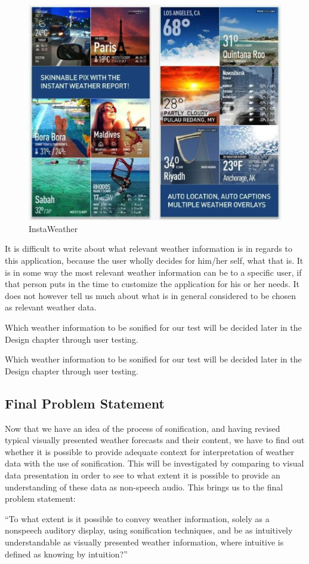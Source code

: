 \begin{figure}[!htbp]
    \centering
    \includegraphics[width=.7\textwidth]{images/Instaweather1.png}
    \caption{InstaWeather}
    \label{fig:instaweather1}
\end{figure}

It is difficult to write about what relevant weather information is in regards to this application, because the user wholly decides for him/her self, what that is. It is in some way the most relevant weather information can be to a specific user, if that person puts in the time to customize the application for his or her needs. It does not however tell us much about what is in general considered to be chosen as relevant weather data.

Which weather information to be sonified for our test will be decided later in the Design chapter through user testing.


Which weather information to be sonified for our test will be decided later in the Design chapter through user testing.



\subsection{Final Problem Statement} %
\label{sub:final_problem_statement}

Now that we have an idea of the process of sonification, and having revised typical visually presented weather forecasts and their content, we have to find out whether it is possible to provide adequate context for interpretation of weather data with the use of sonification. This will be investigated by comparing to visual data presentation in order to see to what extent it is possible to provide an understanding of these data as non-speech audio. This brings us to the  final problem statement:

\enquote{To what extent is it possible to convey weather information, solely as a nonspeech auditory display, using sonification techniques, and be as intuitively understandable as visually presented weather information, where intuitive is defined as knowing by intuition?}


